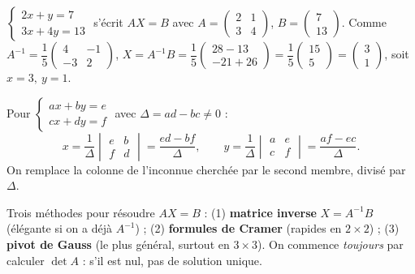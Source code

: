 \begin{exemple}
$\left\{\begin{array}{l}2x+y=7\\3x+4y=13\end{array}\right.$ s'écrit $AX=B$ avec
$A=\begin{pmatrix}2&1\\3&4\end{pmatrix}$, $B=\begin{pmatrix}7\\13\end{pmatrix}$. Comme
$A^{-1}=\dfrac15\begin{pmatrix}4&-1\\-3&2\end{pmatrix}$,
$X=A^{-1}B=\dfrac15\begin{pmatrix}28-13\\-21+26\end{pmatrix}=\dfrac15\begin{pmatrix}15\\5\end{pmatrix}
=\begin{pmatrix}3\\1\end{pmatrix}$, soit $x=3,\ y=1$.
\end{exemple}

\begin{propriete}
Pour $\left\{\begin{array}{l}ax+by=e\\cx+dy=f\end{array}\right.$ avec $\Delta=ad-bc\neq0$ :
\[
x=\frac1\Delta\begin{vmatrix}e&b\\f&d\end{vmatrix}=\frac{ed-bf}{\Delta},\qquad
y=\frac1\Delta\begin{vmatrix}a&e\\c&f\end{vmatrix}=\frac{af-ec}{\Delta}.
\]
On remplace la colonne de l'inconnue cherchée par le second membre, divisé par $\Delta$.
\end{propriete}

\begin{aretenir}
Trois méthodes pour résoudre $AX=B$ : (1) \textbf{matrice inverse} $X=A^{-1}B$ (élégante si on
a déjà $A^{-1}$) ; (2) \textbf{formules de Cramer} (rapides en $2\times2$) ; (3) \textbf{pivot
de Gauss} (le plus général, surtout en $3\times3$). On commence \emph{toujours} par calculer
$\det A$ : s'il est nul, pas de solution unique.
\end{aretenir}

